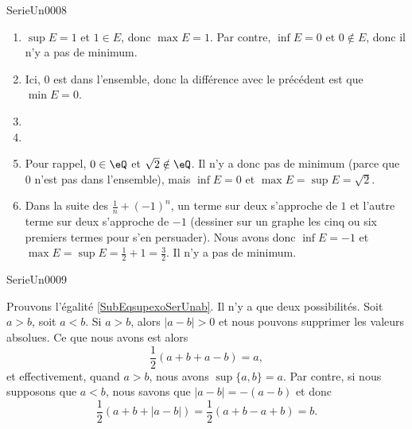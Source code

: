 \documentclass{article}
\begin{document}
\begin{corrige}{SerieUn0008}

	\begin{enumerate}

		\item
			$\sup E=1$ et $1\in E$, donc $\max E=1$. Par contre, $\inf E=0$ et $0\notin E$, donc il n'y a pas de minimum.
		\item
			Ici, $0$ est dans l'ensemble, donc la différence avec le précédent est que $\min E=0$. 
		\item
		\item
		\item
			Pour rappel, $0\in\eQ$ et $\sqrt{2}\notin\eQ$. Il n'y a donc pas de minimum (parce que $0$ n'est pas dans l'ensemble), mais $\inf E=0$ et $\max E=\sup E=\sqrt{2}$.
		\item
			Dans la suite des $\frac{1}{ n }+(-1)^n$, un terme sur deux s'approche de $1$ et l'autre terme sur deux s'approche de $-1$ (dessiner sur un graphe les cinq ou six premiers termes pour s'en persuader). Nous avons donc $\inf E=-1$ et $\max E=\sup E=\frac{1}{ 2 }+1=\frac{ 3 }{ 2 }$. Il n'y a pas de minimum.

	\end{enumerate}

\end{corrige}


\begin{corrige}{SerieUn0009}

	Prouvons l'égalité \eqref{SubEqsupexoSerUnab}. Il n'y a que deux possibilités. Soit $a>b$, soit $a<b$. Si $a>b$, alors $| a-b |>0$ et nous pouvons supprimer les valeurs absolues. Ce que nous avons est alors
	\begin{equation}
		\frac{ 1 }{2}(a+b+a-b)=a,
	\end{equation}
	et effectivement, quand $a>b$, nous avons $\sup\{ a,b \}=a$. Par contre, si nous supposons que $a<b$, nous savons que $| a-b |=-(a-b)$ et donc
	\begin{equation}
		\frac{ 1 }{2}(a+b+| a-b |)=\frac{ 1 }{2}(a+b-a+b)=b.
	\end{equation}

\end{corrige}
\end{document}
